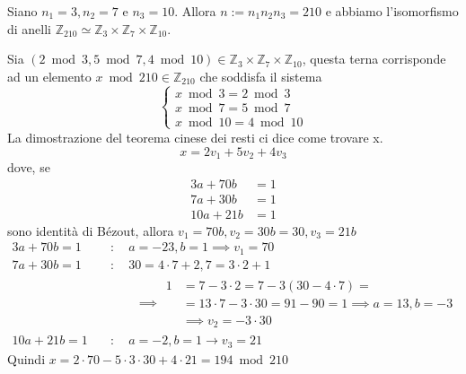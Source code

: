 \documentclass[../main.tex]{subfiles}
\begin{document}
\begin{example}
    Siano $n_1 = 3, n_2 = 7 $ e $ n_3 = 10$. Allora $n := n_1 n_2 n_3 = 210$ e abbiamo l'isomorfismo di anelli $\mathbb{Z}_{210} \simeq \mathbb{Z}_3 \times \mathbb{Z}_7 \times \mathbb{Z}_{10}$.

    Sia $(2 \bmod 3, 5 \bmod 7, 4 \bmod 10) \in \mathbb{Z}_3 \times \mathbb{Z}_7 \times \mathbb{Z}_{10}$, questa terna corrisponde ad un elemento $x \bmod 210 \in \mathbb{Z}_{210}$ che soddisfa il sistema
    \begin{equation*}
        \begin{cases}
            x\bmod 3 = 2\bmod 3 \\
            x\bmod 7 = 5\bmod 7 \\
            x\bmod 10 = 4\bmod 10
        \end{cases}
    \end{equation*}
    La dimostrazione del teorema cinese dei resti ci dice come trovare x.
    \begin{equation*}
        x = 2 v_1 + 5 v_2 + 4 v_3
    \end{equation*}
    dove, se
    \begin{align*}
        3 a + 70 b  & = 1 \\
        7 a + 30 b  & = 1 \\
        10 a + 21 b & = 1
    \end{align*}
    sono identità di Bézout, allora $v_1 = 70 b, v_2 = 30 b  = 30, v_3 = 21 b$
    \begin{equation*}
        \begin{aligned}
            3 a + 70 b = 1  & \quad : \quad a = -23, b = 1 \implies v_1 = 70       \\
            7 a + 30 b = 1  & \quad : \quad 30 = 4 \cdot 7 + 2 , 7 = 3 \cdot 2 + 1 \\
                            & \quad \qquad\implies
            \begin{aligned}
                1 & = 7 - 3 \cdot 2 = 7 - 3(30 - 4 \cdot 7) =                        \\
                  & =  13 \cdot 7 - 3 \cdot 30 = 91 - 90 = 1 \implies a = 13, b = -3 \\
                  & \implies v_2 = -3 \cdot 30
            \end{aligned}   \\
            10 a + 21 b = 1 & \quad : \quad  a = -2, b = 1 \rightarrow v_3 = 21
        \end{aligned}
    \end{equation*}
    Quindi $x = 2 \cdot 70 - 5 \cdot 3 \cdot 30 + 4 \cdot 21 = 194\bmod 210$\\
\end{example}
\end{document}
